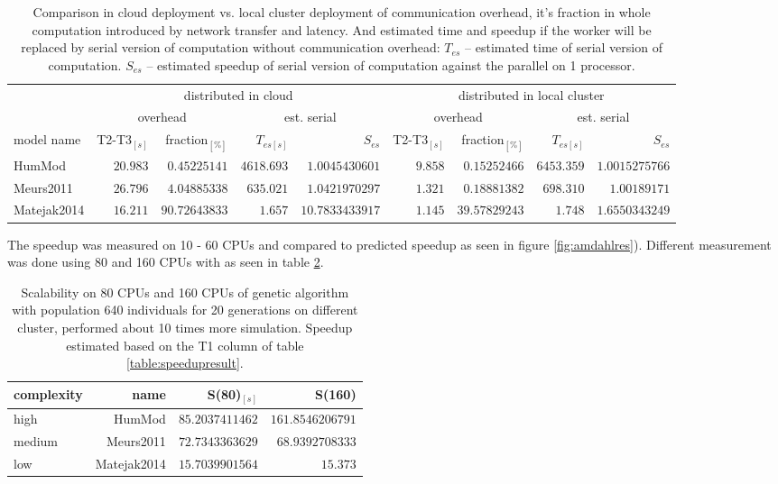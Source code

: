 \begin{table}[ht]
\footnotesize
\begin{tabular}{|l|r|r|r|r|r|r|r|r|}
\hline
& \multicolumn{4}{c|}{distributed in cloud} & \multicolumn{4}{c|}{distributed in local cluster} \\
 & \multicolumn{2}{c|}{overhead} & \multicolumn{2}{c|}{est. serial} & \multicolumn{2}{c|}{overhead} & \multicolumn{2}{c|}{est. serial} \\
model name & T2-T3$_{[s]}$ & fraction$_{[\%]}$ & $T_{es [s]}$ & $S_{es}$ & T2-T3$_{[s]}$ & fraction$_{[\%]}$ & $T_{es [s]}$ & $S_{es}$\\
\hline
HumMod \cite{Kofranek2011hummod} & $\num{20.983}$ & $\num{0.45225141}$ & $\num{4618.693}$ & $\num{1.0045430601}$ & $\num{9.858}$ & $\num{0.15252466}$ & $\num{6453.359}$ & $\num{1.0015275766}$ \\
Meurs2011 \cite{Meurs2011} & $\num{26.796}$ & $\num{4.04885338}$ & $\num{635.021}$ & $\num{1.0421970297}$ & $\num{1.321}$ &  $\num{0.18881382}$ & $\num{698.310}$ &$\num{1.00189171}$\\
Matejak2014\cite{Matejak2014sj} & $\num{16.211}$ & $\num{90.72643833}$ & $\num{1.657}$ & $\num{10.7833433917}$ & $\num{1.145}$ &  $\num{39.57829243}$ & $\num{1.748}$ &$\num{1.6550343249}$\\
\hline
\end{tabular}
\caption{ Comparison in cloud deployment vs. local cluster deployment of communication overhead, it's fraction in whole computation introduced by network transfer and latency. And estimated time and speedup if the worker will be replaced by serial version of computation without communication overhead: $T_{es}$ -- estimated time of serial version of computation. $S_{es}$ -- estimated speedup of serial version of computation against the parallel on 1 processor.}
\label{table:overhead}
\end{table}

The speedup was measured on 10 - 60 CPUs and compared to predicted speedup as seen in figure \ref{fig:amdahlres}). Different measurement was done using 80 and 160 CPUs with as seen in table \ref{table:speedupresult3}.

\begin{table}[htb]
\footnotesize
\begin{tabular}{|l|r|r|r|}
\hline
complexity & name & S(80)$_{[s]}$ & S(160)\\
\hline
high & HumMod \cite{Kofranek2011hummod} & $\num{85.2037411462}$ & $\num{161.8546206791}$ \\
medium & Meurs2011\cite{Meurs2011} & $\num{72.7343363629}$ & $\num{68.9392708333}$ \\
low & Matejak2014\cite{Matejak2014sj} & $\num{15.7039901564}$ & $\num{15.373}$\\ \hline
\end{tabular}
\caption{Scalability on 80 CPUs and 160 CPUs of genetic algorithm with population 640 individuals for 20 generations on different cluster, performed about 10 times more simulation. Speedup estimated based on the T1 column of table \ref{table:speedupresult}.}
\label{table:speedupresult3}
\end{table}

